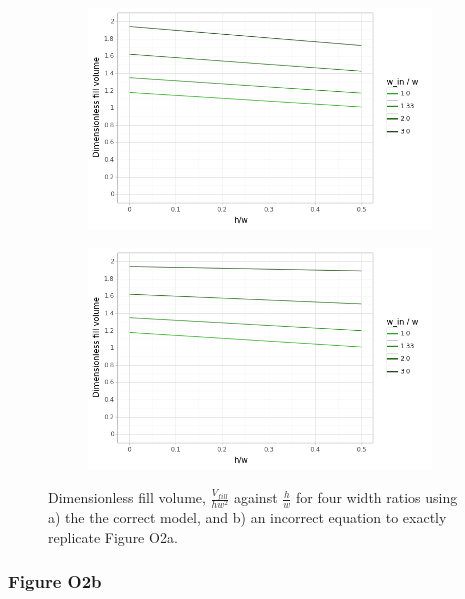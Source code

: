 \begin{figure}[ht]
  \centering
  \begin{subfigure}[b]{0.4\linewidth}
    \includegraphics[width=\linewidth]{../figures/fig_2a.png}
    \caption{}
    \label{fig2a}
  \end{subfigure}
  \begin{subfigure}[b]{0.4\linewidth}
    \includegraphics[width=\linewidth]{../figures/fig_2a_incorrect.png}
    \caption{}
    \label{fig2a_bad}
  \end{subfigure}
  \caption{Dimensionless fill volume, $\frac{V_{fill}}{hw^2}$ against $\frac{h}{w}$
  for four width ratios using a) the the correct model, and b) an
  incorrect equation to exactly replicate Figure O2a.}
\end{figure}

\subsubsection{Figure O2b}

